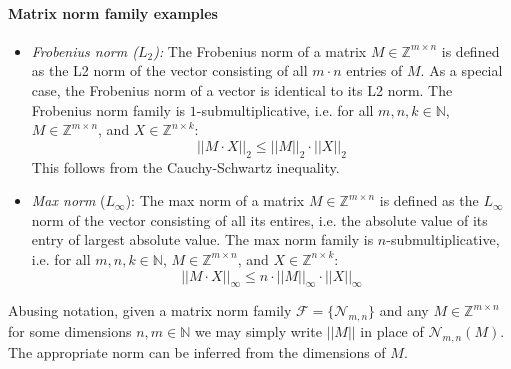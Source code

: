 \paragraph{Matrix norm family examples} 
\begin{itemize}
\item \emph{Frobenius norm ($L_2$):} The Frobenius norm of a matrix $M \in \mathbb{Z}^{m \times n}$ is defined as the L2 norm of the vector consisting of all $m \cdot n$ entries of $M$. As a special case, the Frobenius norm of a vector is identical to its L2 norm. The Frobenius norm family is $1$-submultiplicative, i.e. for all $m, n, k \in \mathbb{N}$, $M \in \mathbb{Z}^{m \times n}$, and $X \in \mathbb{Z}^{n \times k}$: 
		$$||M \cdot X||_2 \leq ||M||_2 \cdot ||X||_2 $$  
		This follows from the Cauchy-Schwartz inequality. 
\item \emph{Max norm} ($L_\infty$): The max norm of a matrix $M \in \mathbb{Z}^{m \times n}$ is defined as the $L_\infty$ norm of the vector consisting of all its entires, i.e. the absolute value of its entry of largest absolute value. The max norm family is $n$-submultiplicative, i.e. for all $m, n, k \in \mathbb{N}$, $M \in \mathbb{Z}^{m \times n}$, and $X \in \mathbb{Z}^{n \times k}$: 
		$$||M \cdot X||_\infty \leq n \cdot ||M||_\infty \cdot ||X||_\infty $$ 
\end{itemize}

Abusing notation, given a matrix norm family $\mathcal{F} = \{\mathcal{N}_{m,n} \}$ and any $M \in \mathbb{Z}^{m \times n}$ for some dimensions $n,m \in \mathbb{N}$ we may simply write $||M||$ in place of $\mathcal{N}_{m,n}(M)$. The appropriate norm can be inferred from the dimensions of $M$.  

